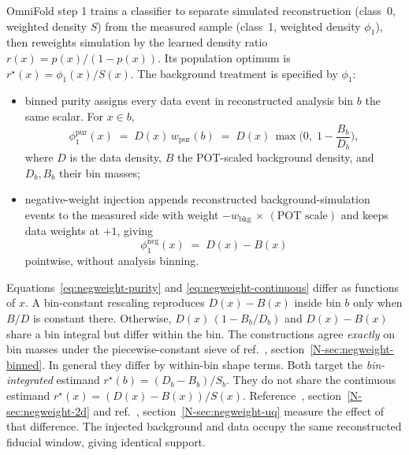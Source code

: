 OmniFold step 1 trains a classifier to separate simulated reconstruction (class~0, weighted density $S$) from the measured sample (class~1, weighted density $\phi_1$), then reweights simulation by the learned density ratio $r(x)=p(x)/(1-p(x))$. Its population optimum is $r^{\star}(x)=\phi_1(x)/S(x)$. The background treatment is specified by $\phi_1$:
\begin{itemize}
  \item binned purity assigns every data event in reconstructed analysis bin $b$ the same scalar. For $x\in b$,
    \begin{equation}
      \label{eq:negweight-purity}
      \phi_1^{\mathrm{pur}}(x)
      \;=\; D(x)\,w_{\mathrm{pur}}(b)
      \;=\; D(x)\,\max\!\Big(0,\;1-\frac{B_{b}}{D_{b}}\Big),
    \end{equation}
    where $D$ is the data density, $B$ the POT-scaled background density, and $D_{b},B_{b}$ their bin masses;
  \item negative-weight injection appends reconstructed background-simulation events to the measured side with weight $-w_{\mathrm{bkg}}\,\times\,(\text{POT scale})$ and keeps data weights at $+1$, giving
    \begin{equation}
      \label{eq:negweight-continuous}
      \phi_1^{\mathrm{neg}}(x) \;=\; D(x)-B(x)
    \end{equation}
    pointwise, without analysis binning.
\end{itemize}
Equations~\eqref{eq:negweight-purity} and \eqref{eq:negweight-continuous} differ as functions of $x$. A bin-constant rescaling reproduces $D(x)-B(x)$ inside bin $b$ only when $B/D$ is constant there. Otherwise, $D(x)\,(1-B_{b}/D_{b})$ and $D(x)-B(x)$ share a bin integral but differ within the bin. The constructions agree \emph{exactly} on bin masses under the piecewise-constant sieve of ref.~\cite{AnalysisNote2026}, section~\ref*{N-sec:negweight-binned}. In general they differ by within-bin shape terms. Both target the \emph{bin-integrated} estimand $r^{\star}(b)=(D_{b}-B_{b})/S_{b}$. They do not share the continuous estimand $r^{\star}(x)=(D(x)-B(x))/S(x)$. Reference~\cite{AnalysisNote2026}, section~\ref*{N-sec:negweight-2d} and ref.~\cite{AnalysisNote2026}, section~\ref*{N-sec:negweight-uq} measure the effect of that difference. The injected background and data occupy the same reconstructed fiducial window, giving identical support.

